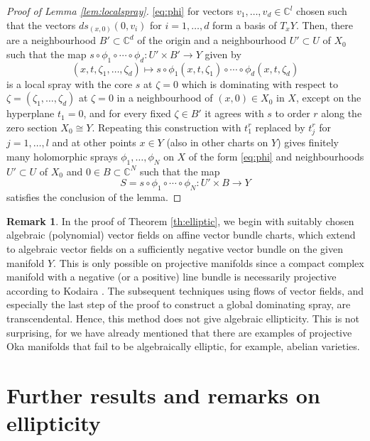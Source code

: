 \documentclass[12pt]{amsart}
\theoremstyle{definition}
\newtheorem{remark}[theorem]{Remark}
\numberwithin{equation}{section}
\numberwithin{figure}{section}
\newcommand\C{\mathbb{C}}
\numberwithin{equation}{section}
\begin{document}
\begin{proof}[Proof of Lemma \ref{lem:localspray}]
\eqref{eq:phi} for vectors $v_1,\ldots,v_d\in \C^l$ chosen such that 
the vectors $ds_{(x,0)}(0,v_i)$ for $i=1,\ldots,d$ form a basis
of $T_x Y$. Then, there are a neighbourhood $B'\subset\C^d$
of the origin and a neighbourhood $U'\subset U$ of $X_0$
such that the map
$
	s \circ \phi_1\circ\cdots\circ\phi_d : U' \times B' \to Y
$
given by 
\[
	(x,t,\zeta_1,\ldots,\zeta_d) \longmapsto 
	s \circ \phi_1(x,t,\zeta_1)\circ\cdots \circ \phi_d(x,t,\zeta_d)
\]
is a local spray with the core $s$ at $\zeta=0$ 
which is dominating with respect to  
$\zeta=(\zeta_1,\ldots,\zeta_d)$ at $\zeta=0$ 
in a neighbourhood of $(x,0)\in X_0$ in $X$, except on the
hyperplane $t_1=0$, and for every fixed $\zeta\in B'$
it agrees with $s$ to order $r$ along 
the zero section $X_0\cong Y$. Repeating this construction with $t_1^r$
replaced by $t_j^r$ for $j=1,\ldots,l$ and at other points $x\in Y$
(also in other charts on $Y$)
gives finitely many holomorphic sprays $\phi_1,\ldots, \phi_N$ on $X$ 
of the form \eqref{eq:phi} and neighbourhoods $U'\subset U$ of $X_0$
and $0\in B\subset \C^N$ such that the map 
\[
	S=s \circ \phi_1\circ\cdots\circ\phi_N : U' \times B \to Y
\]
satisfies the conclusion of the lemma.
\end{proof}


\begin{remark}\label{rem:maintheorem}
In the proof of Theorem \ref{th:elliptic}, we 
begin with suitably chosen algebraic (polynomial) vector fields
on affine vector bundle charts, which extend 
to algebraic vector fields on a sufficiently negative vector bundle 
on the given manifold $Y$. 
This is only possible on projective manifolds
since a compact complex manifold with a negative 
(or a positive) line bundle is necessarily projective
according to Kodaira \cite{Kodaira1954}. 
The subsequent techniques using flows of vector fields, 
and especially the last step of the proof to construct
a global dominating spray, are transcendental.
Hence, this method does not give algebraic ellipticity.
This is not surprising, for we have already mentioned that 
there are examples of projective Oka manifolds 
that fail to be algebraically elliptic, for example, abelian varieties.
\end{remark}


%
%
\section{Further results and remarks on ellipticity}
\label{sec:remarks}
\end{document}

